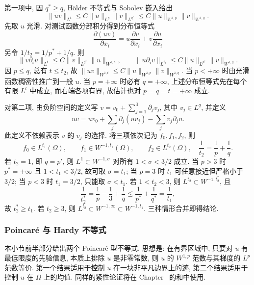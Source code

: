 \begin{Proof}
第一项中, 因 $q^*\geq q$, H\"older 不等式与 Sobolev 嵌入给出
\[
 \|uv\|_{L^t}\leq C\|u\|_{L^p}\|v\|_{L^{q^*}}
 \leq C\|u\|_{W^{1,p}}\|v\|_{W^{1,q}}.
\]
先取 $u$ 光滑. 对测试函数分部积分得到分布恒等式
\begin{equation}
 \frac{\partial(uv)}{\partial x_i}
 =u\frac{\partial v}{\partial x_i}+v\frac{\partial u}{\partial x_i}
 \label{eq:chap3-sobolev-product-rule}
\end{equation}
另令 $1/t_2=1/p^*+1/q$. 则
\[
 \|v\partial_i u\|_{L^t}\leq C\|v\|_{L^{q^*}}\|u\|_{W^{1,p}},
 \qquad
 \|u\partial_i v\|_{L^{t_2}}\leq C\|u\|_{L^{p^*}}\|v\|_{W^{1,q}}.
\]
因 $p\leq q$, 总有 $t\leq t_2$, 故 $\|uv\|_{W^{1,t}}\leq C\|u\|_{W^{1,p}}\|v\|_{W^{1,q}}$. 当 $p<+\infty$ 时由光滑函数稠密性推广到一般 $u$. 当 $p=+\infty$ 时必有 $q=+\infty$, 上述分布恒等式先在每个有限 $L^t$ 中成立, 而右端各项有界, 故估计也对 $p=q=t=+\infty$ 成立.

对第二项, 由负阶空间的定义写 $v=v_0+\sum_{j=1}^3\partial_jv_j$, 其中 $v_j\in L^q$, 并定义
\[
 uv=uv_0+\sum_j\partial_j(uv_j)-\sum_jv_j\partial_ju.
\]
此定义不依赖表示 $v$ 的 $v_j$ 的选择. 将三项依次记为 $f_0,f_1,f_2$, 则
\[
 f_0\in L^{t_1}(\Omega),
 \qquad f_1\in W^{-1,t_1}(\Omega),
 \qquad f_2\in L^{t_2}(\Omega),
 \quad\frac1{t_2}=\frac1p+\frac1q.
\]
若 $t_2=1$, 即 $q=p'$, 则 $L^1\subset W^{-1,\sigma}$ 对所有 $1<\sigma<3/2$ 成立. 当 $p>3$ 时 $p^*=+\infty$ 且 $1<t_1<3/2$, 故可取 $\sigma=t_1$; 当 $p=3$ 时 $t_1$ 可任意接近但严格小于 $3/2$; 当 $p<3$ 时 $t_1=3/2$, 只能取 $\sigma<t_1$. 若 $1<t_2<3$, 则 $L^{t_2}\subset W^{-1,t_2^*}$, 且
\[
 \frac1{t_2^*}=\frac1p-\frac13+\frac1q
 \leq\frac1{p^*}+\frac1{q^*}=\frac1{t_1},
\]
故 $t_2^*\geq t_1$. 若 $t_2\geq3$, 则 $L^{t_2}\subset W^{-1,\infty}\subset W^{-1,t_1}$. 三种情形合并即得结论.
\end{Proof}

\subsubsection{Poincar\'e 与 Hardy 不等式}
\label{subsec:chap3-poincare-hardy}

本小节前半部分给出两个 Poincar\'e 型不等式. 思想是: 在有界区域中, 只要对 $u$ 有最低限度的先验信息, 本质上排除 $u$ 是非零常数, 则 $u$ 的 $W^{1,p}$ 范数与其梯度的 $L^p$ 范数等价. 第一个结果适用于控制 $u$ 在一块非平凡边界上的迹, 第二个结果适用于控制 $u$ 在 $\Omega$ 上的均值. 同样的紧性论证将在 Chapter~ 的和中使用.

